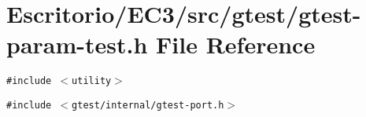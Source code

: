 \section{Escritorio/EC3/src/gtest/gtest-param-test.h File Reference}
\label{gtest-param-test_8h}
{\tt \#include $<$utility$>$}\par
{\tt \#include $<$gtest/internal/gtest-port.h$>$}\par
